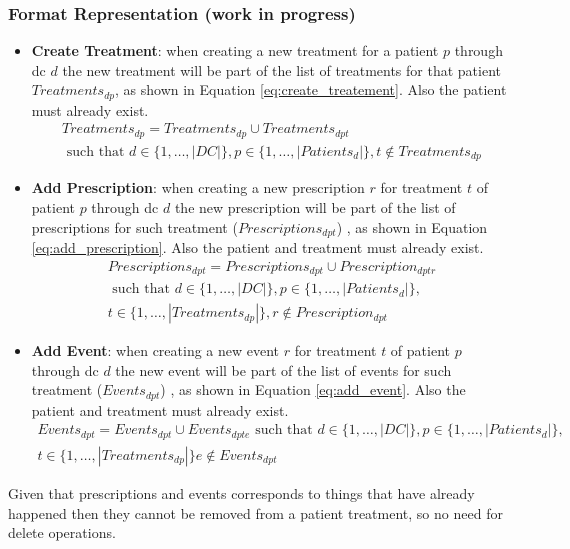 \subsubsection{Format Representation (work in progress)}
\begin{itemize}
	\item {\bf Create Treatment}: when creating a new treatment for a patient $p$ through \gls{dc} $d$ the new treatment will be part of the list of treatments for that patient $Treatments_{dp}$, as shown in Equation \ref{eq:create_treatement}. Also the patient must already exist.
		\begin{multline} \label{eq:create_treatement}
			Treatments_{dp} = Treatments_{dp} \cup Treatments_{dpt} \\ \text{ such that } d \in \{1,\dots, |DC|\}, p \in \{1,\dots, |Patients_{d}|\}, t \not\in Treatments_{dp}
		\end{multline}
	\item {\bf Add Prescription}: when creating a new prescription $r$ for treatment $t$ of patient $p$ through \gls{dc} $d$ the new prescription will be part of the list of prescriptions for such treatment ($Prescriptions_{dpt}$) , as shown in Equation \ref{eq:add_prescription}. Also the patient and treatment must already exist.
		\begin{multline} \label{eq:add_prescription}
			Prescriptions_{dpt} = Prescriptions_{dpt} \cup Prescription_{dptr}\\ \text{ such that } d \in \{1,\dots, |DC|\}, p \in \{1,\dots, |Patients_{d}|\}, \\ t \in \{1,\dots, |Treatments_{dp}|\}, r \not\in Prescription_{dpt}
		\end{multline}
	\item {\bf Add Event}: when creating a new event $r$ for treatment $t$ of patient $p$ through \gls{dc} $d$ the new event will be part of the list of events for such treatment ($Events_{dpt}$) , as shown in Equation \ref{eq:add_event}. Also the patient and treatment must already exist.
		\begin{multline} \label{eq:add_event}
			Events_{dpt} = Events_{dpt} \cup Events_{dpte} \text{ such that } d \in \{1,\dots, |DC|\}, p \in \{1,\dots, |Patients_{d}|\}, \\ t \in \{1,\dots, |Treatments_{dp}|\} e \not\in Events_{dpt}	
		\end{multline}
\end{itemize}

Given that prescriptions and events corresponds to things that have already happened then they cannot be removed from a patient treatment, so no need for delete operations.

